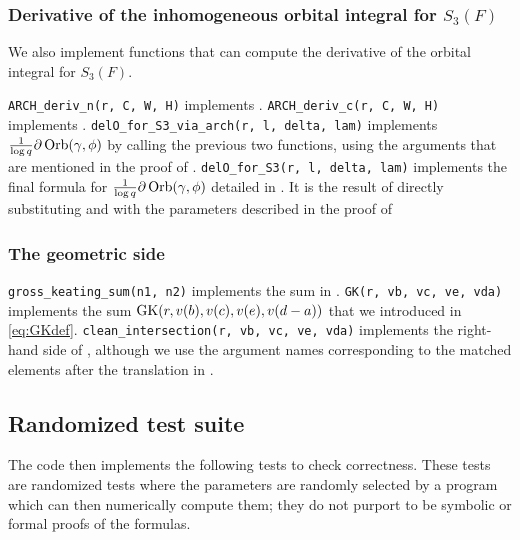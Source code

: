 \subsubsection{Derivative of the inhomogeneous orbital integral for $S_3(F)$}
We also implement functions that can compute the
derivative of the orbital integral for $S_3(F)$.

\begin{itemize}
  \ii \texttt{ARCH\_deriv\_n(r, C, W, H)} implements .
  \ii \texttt{ARCH\_deriv\_c(r, C, W, H)} implements .
  \ii \texttt{delO\_for\_S3\_via\_arch(r, l, delta, lam)} implements
  $\frac{1}{\log q}\partial\operatorname{Orb}(\gamma, \phi)$
  by calling the previous two functions,
  using the arguments that are mentioned in the proof of .
  \ii \texttt{delO\_for\_S3(r, l, delta, lam)} implements the final formula for
  $\frac{1}{\log q}\partial\operatorname{Orb}(\gamma, \phi)$
  detailed in .
  It is the result of directly substituting  and 
  with the parameters described in the proof of 
\end{itemize}

\subsubsection{The geometric side}
\begin{itemize}
  \ii \texttt{gross\_keating\_sum(n1, n2)} implements the sum in .
  \ii \texttt{GK(r, vb, vc, ve, vda)} implements the sum $\operatorname{GK}(r, v(b), v(c), v(e), v(d-a))$
  that we introduced in \eqref{eq:GKdef}.
  \ii \texttt{clean\_intersection(r, vb, vc, ve, vda)} implements the
  right-hand side of ,
  although we use the argument names corresponding to the matched elements
  after the translation in .
\end{itemize}

\subsection{Randomized test suite}
The code then implements the following tests to check correctness.
These tests are randomized tests where the parameters are randomly selected by a program
which can then numerically compute them;
they do not purport to be symbolic or formal proofs of the formulas.

